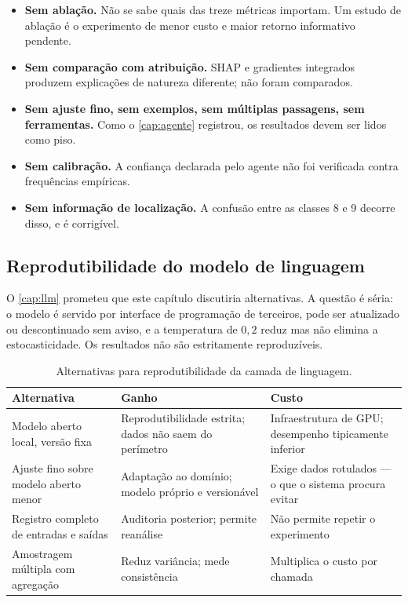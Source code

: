 \begin{itemize}[leftmargin=*,itemsep=0.3em]
  \item \textbf{Sem ablação.} Não se sabe quais das treze métricas importam. Um estudo de
        ablação é o experimento de menor custo e maior retorno informativo pendente.
  \item \textbf{Sem comparação com atribuição.} SHAP e gradientes integrados produzem
        explicações de natureza diferente; não foram comparados.
  \item \textbf{Sem ajuste fino, sem exemplos, sem múltiplas passagens, sem ferramentas.}
        Como o \cref{cap:agente} registrou, os resultados devem ser lidos como piso.
  \item \textbf{Sem calibração.} A confiança declarada pelo agente não foi verificada
        contra frequências empíricas.
  \item \textbf{Sem informação de localização.} A confusão entre as classes 8 e 9 decorre
        disso, e é corrigível.
\end{itemize}

\subsection{Reprodutibilidade do modelo de linguagem}

O \cref{cap:llm} prometeu que este capítulo discutiria alternativas. A questão é séria:
o modelo é servido por interface de programação de terceiros, pode ser atualizado ou
descontinuado sem aviso, e a temperatura de $0{,}2$ reduz mas não elimina a
estocasticidade. Os resultados não são estritamente reproduzíveis.

\begin{table}[htbp]
\centering
\caption{Alternativas para reprodutibilidade da camada de linguagem.}
\label{tab:fut-repro}
\small
\begin{tabular}{p{3.0cm}p{4.4cm}p{4.6cm}}
\toprule
\textbf{Alternativa} & \textbf{Ganho} & \textbf{Custo} \\
\midrule
Modelo aberto local, versão fixa &
Reprodutibilidade estrita; dados não saem do perímetro &
Infraestrutura de GPU; desempenho tipicamente inferior \\
\addlinespace
Ajuste fino sobre modelo aberto menor &
Adaptação ao domínio; modelo próprio e versionável &
Exige dados rotulados --- o que o sistema procura evitar \\
\addlinespace
Registro completo de entradas e saídas &
Auditoria posterior; permite reanálise &
Não permite repetir o experimento \\
\addlinespace
Amostragem múltipla com agregação &
Reduz variância; mede consistência &
Multiplica o custo por chamada \\
\bottomrule
\end{tabular}
\end{table}

